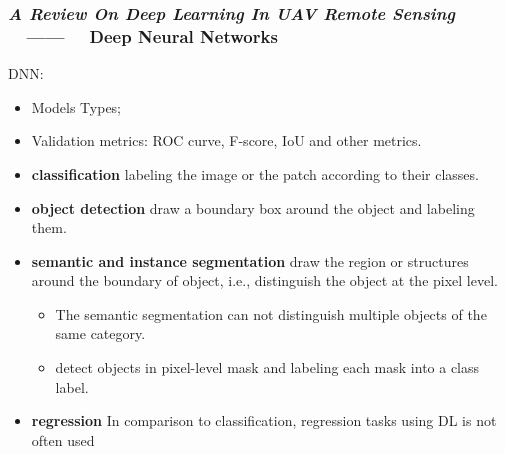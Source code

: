 \begin{frame}
    \frametitle{\textit{A Review On Deep Learning In UAV Remote Sensing}
    ~~------~~ Deep Neural Networks}

    \begin{block}{DNN:}
        \begin{itemize}
            \item Models Types;
            \item Validation metrics: ROC curve, F-score, IoU and other metrics.
        \end{itemize}
    \end{block}

    \begin{itemize}
        \item \textbf{classification}\linebreak
            labeling the image or the patch according to their classes.
        \item \textbf{object detection}\linebreak
            draw a boundary box around the object and labeling them.
        \item \textbf{semantic and instance segmentation}\linebreak
            draw the region or structures around the boundary of object,
            i.e., distinguish the object at the pixel level.
            \begin{itemize}
                \item The semantic segmentation can not distinguish multiple
                    objects of the same category.
                \item detect objects in pixel-level mask and labeling each
                    mask into a class label.
            \end{itemize}
        \item \textbf{regression}\linebreak
            In comparison to classification, regression tasks using DL is
            not often used
    \end{itemize}

\end{frame}

